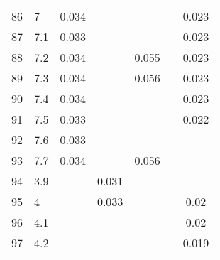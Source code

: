 \begin{longtable}{lp{7cm}ccccc}
  86 & 7 & 0.034 &  &  &  & 0.023 \\ 
  87 & 7.1 & 0.033 &  &  &  & 0.023 \\ 
  88 & 7.2 & 0.034 &  & 0.055 &  & 0.023 \\ 
  89 & 7.3 & 0.034 &  & 0.056 &  & 0.023 \\ 
  90 & 7.4 & 0.034 &  &  &  & 0.023 \\ 
  91 & 7.5 & 0.033 &  &  &  & 0.022 \\ 
  92 & 7.6 & 0.033 &  &  &  &  \\ 
  93 & 7.7 & 0.034 &  & 0.056 &  &  \\ 
  94 & 3.9 &  & 0.031 &  &  &  \\ 
  95 & 4 &  & 0.033 &  &  & 0.02 \\ 
  96 & 4.1 &  &  &  &  & 0.02 \\ 
  97 & 4.2 &  &  &  &  & 0.019 \\ 
   \bottomrule
\end{longtable}
